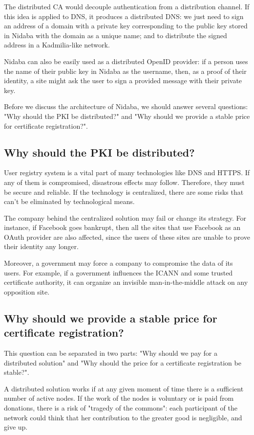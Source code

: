 \documentclass[12pt]{article}
\begin{document}
The distributed CA would decouple authentication from a distribution channel. If this idea is applied to DNS, it produces a distributed DNS: we just need to sign an address of a domain with a private key corresponding to the public key stored in Nidaba with the domain as a unique name; and to distribute the signed address in a Kadmilia-like network.

Nidaba can also be easily used as a distributed OpenID provider: if a person uses the name of their public key in Nidaba as the username, then, as a proof of their identity, a site might ask the user to sign a provided message with their private key.

Before we discuss the architecture of Nidaba, we should answer several questions: "Why should the PKI be distributed?" and "Why should we provide a stable price for certificate registration?".


\subsection{Why should the PKI be distributed?}

User registry system is a vital part of many technologies like DNS and HTTPS. If any of them is compromised, disastrous effects may follow. Therefore, they must be secure and reliable. If the technology is centralized, there are some risks that can't be eliminated by technological means.

The company behind the centralized solution may fail or change its strategy. For instance, if Facebook goes bankrupt, then all the sites that use Facebook as an OAuth provider are also affected, since the users of these sites are unable to prove their identity any longer.

Moreover, a government may force a company to compromise the data of its users. For example, if a government influences the ICANN and some trusted certificate authority, it can organize an invisible man-in-the-middle attack on any opposition site.


\subsection{Why should we provide a stable price for certificate registration?}

This question can be separated in two parts: "Why should we pay for a distributed solution" and "Why should the price for a certificate registration be stable?".

A distributed solution works if at any given moment of time there is a sufficient number of active nodes. If the work of the nodes is voluntary or is paid from donations, there is a risk of "tragedy of the commons": each participant of the network could think that her contribution to the greater good is negligible, and give up.
\end{document}
